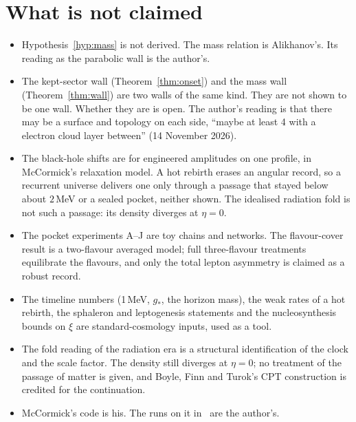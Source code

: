 \documentclass[11pt]{article}
\theoremstyle{definition}\newtheorem{hypothesis}{Hypothesis}\newtheorem{prediction}{Prediction}
\theoremstyle{remark}\newtheorem{remark}[theorem]{Remark}
\begin{document}
\section{What is not claimed}\label{sec:notclaimed}
\begin{itemize}[nosep]
\item Hypothesis~\ref{hyp:mass} is not derived. The mass relation is Alikhanov's. Its reading as the parabolic wall is the author's.
\item The kept-sector wall (Theorem~\ref{thm:onset}) and the mass wall (Theorem~\ref{thm:wall}) are two walls of the same kind. They are not shown to be one wall. Whether they are is open. The author's reading is that there may be a surface and topology on each side, ``maybe at least 4 with a electron cloud layer between'' (14 November 2026).
\item The black-hole shifts are for engineered amplitudes on one profile, in McCormick's relaxation model. A hot rebirth erases an angular record, so a recurrent universe delivers one only through a passage that stayed below about $2$\,MeV or a sealed pocket, neither shown. The idealised radiation fold is not such a passage: its density diverges at $\eta=0$.
\item The pocket experiments A--J are toy chains and networks. The flavour-cover result is a two-flavour averaged model; full three-flavour treatments equilibrate the flavours, and only the total lepton asymmetry is claimed as a robust record.
\item The timeline numbers (1\,MeV, $g_*$, the horizon mass), the weak rates of a hot rebirth, the sphaleron and leptogenesis statements and the nucleosynthesis bounds on $\xi$ are standard-cosmology inputs, used as a tool.
\item The fold reading of the radiation era is a structural identification of the clock and the scale factor. The density still diverges at $\eta=0$; no treatment of the passage of matter is given, and Boyle, Finn and Turok's CPT construction is credited for the continuation.
\item McCormick's code is his. The runs on it in~\cite{NU10} are the author's.
\end{itemize}
\end{document}
